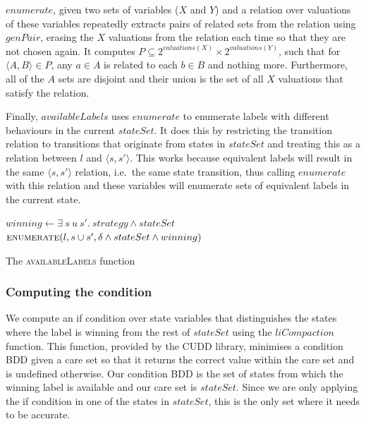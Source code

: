 $enumerate$, given two sets of variables ($X$ and $Y$) and a relation over valuations of these variables repeatedly extracts pairs of related sets from the relation using $genPair$, erasing the $X$ valuations from the relation each time so that they are not chosen again. It computes $P \subseteq 2^{valuations(X)} \times 2^{valuations(Y)}$, such that for $\langle A, B \rangle \in P$, any $a \in A$ is related to each $b \in B$ and nothing more. Furthermore, all of the $A$ sets are disjoint and their union is the set of all $X$ valuations that satisfy the relation.

Finally, $availableLabels$ uses $enumerate$ to enumerate labels with different behaviours in the current $stateSet$. It does this by restricting the transition relation to transitions that originate from states in $stateSet$ and treating this as a relation between $l$ and $\langle s, s' \rangle$. This works because equivalent labels will result in the same $\langle s, s' \rangle$ relation, i.e.\ the same state transition, thus calling $enumerate$ with this relation and these variables will enumerate sets of equivalent labels in the current state.

\begin{algorithm}
\begin{algorithmic}

    \State $winning \gets \exists \: s \: u \: s'. \: strategy \land stateSet$
    \State\Return$\Call{enumerate}{l, s \cup s', \delta \land stateSet \land winning}$
\EndFunction

\end{algorithmic}
\caption{The \textsc{availableLabels} function}
\label{alg:available_labels}
\end{algorithm}

\subsubsection{Computing the condition}

We compute an if condition over state variables that distinguishes the states where the label is winning from the rest of $stateSet$ using the $liCompaction$ function. This function, provided by the CUDD library, minimises a condition BDD given a care set so that it returns the correct value within the care set and is undefined otherwise. Our condition BDD is the set of states from which the winning label is available and our care set is $stateSet$. Since we are only applying the if condition in one of the states in $stateSet$, this is the only set where it needs to be accurate. 

